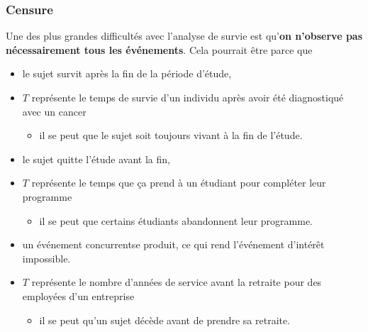 \documentclass{beamer}
\begin{document}
\begin{frame}
\frametitle{Censure}

Une des plus grandes difficultés avec l'analyse de survie est qu'\textbf{on n'observe pas nécessairement tous les événements}.
Cela pourrait être parce que
\begin{itemize}
\vp \vp
\item le sujet survit après la fin de la période d'étude,
\bi \item $T$ représente le temps de survie d'un individu après avoir été diagnostiqué avec un cancer
\begin{itemize} 
\item il se peut que le sujet soit toujours vivant à la fin de l'étude.
\end{itemize}
\ei
\item le sujet quitte l'étude avant la fin,
\bi
\item $T$ représente le temps que ça prend à un étudiant pour compléter leur programme 
\begin{itemize} \item
il se peut que certains étudiants abandonnent leur programme.
\end{itemize}
\ei
\item un événement concurrentse produit, ce qui rend l'événement d'intérêt impossible. \bi
\item $T$ représente le nombre d'années de service avant la retraite pour des employées d'un entreprise 
\begin{itemize} \item il se peut qu'un sujet décède avant de prendre sa retraite. 
\end{itemize}
\ei


\end{itemize}

\end{frame}
% 
% 
% 
% 
% 
% 
% 
\end{document}
